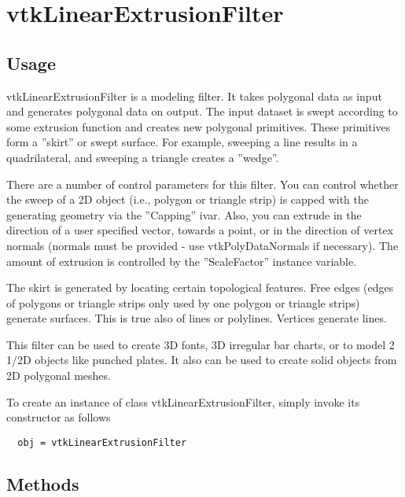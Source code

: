 \section{vtkLinearExtrusionFilter}

\subsection{Usage}

 vtkLinearExtrusionFilter is a modeling filter. It takes polygonal data as 
 input and generates polygonal data on output. The input dataset is swept
 according to some extrusion function and creates new polygonal primitives.
 These primitives form a ''skirt'' or swept surface. For example, sweeping a
 line results in a quadrilateral, and sweeping a triangle creates a ''wedge''.

 There are a number of control parameters for this filter. You can 
 control whether the sweep of a 2D object (i.e., polygon or triangle strip) 
 is capped with the generating geometry via the ''Capping'' ivar. Also, you
 can extrude in the direction of a user specified vector, towards a point,
 or in the direction of vertex normals (normals must be provided - use 
 vtkPolyDataNormals if necessary). The amount of extrusion is controlled by
 the ''ScaleFactor'' instance variable.

 The skirt is generated by locating certain topological features. Free 
 edges (edges of polygons or triangle strips only used by one polygon or
 triangle strips) generate surfaces. This is true also of lines or 
 polylines. Vertices generate lines.

 This filter can be used to create 3D fonts, 3D irregular bar charts,
 or to model 2 1/2D objects like punched plates. It also can be used to 
 create solid objects from 2D polygonal meshes.

To create an instance of class vtkLinearExtrusionFilter, simply
invoke its constructor as follows
\begin{verbatim}
  obj = vtkLinearExtrusionFilter
\end{verbatim}
\subsection{Methods}

